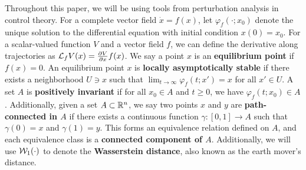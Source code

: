 Throughout this paper, we will be using tools from perturbation analysis in control theory. For a complete vector field $\dot x = f(x)$, let $\varphi_f(\cdot;x_0)$ denote the unique solution to the differential equation with initial condition $x(0) = x_0$. For a scalar-valued function $V$ and a vector field $f$, we can define the derivative along trajectories as $\mathcal{L}_fV(x) = \frac{\partial V}{\partial x}f(x)$. 
We say a point $x$ is an \textbf{equilibrium point} if $f(x) = 0$. An equilibrium point $x$ is \textbf{locally asymptotically stable} if there exists a neighborhood $U \ni x$ such that $\lim_{t \rightarrow \infty} \varphi_f(t;x') = x$ for all $x' \in U$. A set $A$ is \textbf{positively invariant} if for all $x_0 \in A$ and $t \ge 0$, we have $\varphi_f(t;x_0) \in A$. 
Additionally, given a set $A \subset \mathbb{R}^n$, we say two points $x$ and $y$ are \textbf{path-connected in $A$} if there exists a continuous function $\gamma : [0,1] \to A$ such that $\gamma(0) = x$ and $\gamma(1) = y$. This forms an equivalence relation defined on $A$, and each equivalence class is a \textbf{connected component of $A$}. Additionally, we will use $\mathcal{W}_1(\cdot)$ to denote the \textbf{Wasserstein distance}, also known as the earth mover's distance.
